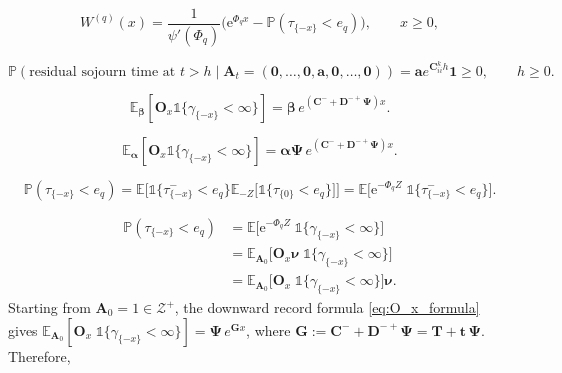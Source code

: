 \documentclass[10pt,a4paper]{amsart}
\newcommand{\PP}{\mathbb{P}}
\newcommand{\e}{\mathrm{e}}
\begin{document}
\begin{equation}\label{eq:Ivanovs_identity}
W^{(q)}(x) = \frac{1}{\psi'(\Phi_q)} \Big( \e^{\Phi_q x} - \PP(\tau_{\{-x\}} < e_q) \Big), \qquad x \ge 0,
\end{equation}

\begin{equation}\label{eq:residual_sojourn_component}
\mathbb{P}(\text{residual sojourn time at } t > h \mid \bm{A}_t = (\bm{0}, \ldots, \bm{0}, \bm{a}, \bm{0}, \ldots, \bm{0})) = \bm{a} e^{\bm{C}_{ii}^k h} \bm{1} \ge 0, \qquad h \ge 0.
\end{equation}

\begin{equation}\label{eq:O_x_formula_minus}
\mathbb{E}_{\bm{\beta}}[\bm{O}_x \mathds{1}\{\gamma_{\{-x\}} < \infty\}] = \bm{\beta} \, e^{(\bm{C}^- + \bm{D}^{-+}\bm{\Psi})x}.
\end{equation}

\begin{equation}\label{eq:O_x_formula}
\mathbb{E}_{\bm{\alpha}}[\bm{O}_x \mathds{1}\{\gamma_{\{-x\}} < \infty\}] = \bm{\alpha} \bm{\Psi} \, e^{(\bm{C}^- + \bm{D}^{-+}\bm{\Psi})x}.
\end{equation}

\begin{equation}\label{eq:hitting_factor}
\PP(\tau_{\{-x\}} < e_q) = \mathbb{E}\Big[\mathds{1}\big\{\tau^-_{\{-x\}} < e_q\big\}\mathbb{E}_{-Z}\big[\mathds{1}\{\tau_{\{0\}} < e_q\}\big]\Big] = \mathbb{E}\Big[\e^{-\Phi_q Z}\;\mathds{1}\big\{\tau^-_{\{-x\}} < e_q\big\}\Big].
\end{equation}

\begin{equation}\label{eqnBoundedVariationTauxProb}
\begin{split}
\PP(\tau_{\{-x\}} < e_q) 
&= \mathbb{E}\Big[\e^{-\Phi_q Z}\;\mathds{1}\{\gamma_{\{-x\}} < \infty\}\Big]\\
&= \mathbb{E}_{\bm A_0}\Big[\bm{O}_x \bm{\nu}\;\mathds{1}\{\gamma_{\{-x\}} < \infty\}\Big]\\
&= \mathbb{E}_{\bm A_0}\Big[\bm{O}_x\;\mathds{1}\{\gamma_{\{-x\}} < \infty\}\Big]\bm{\nu}.
\end{split}
\end{equation}Starting from $\bm{A}_0 = 1 \in \mathcal{Z}^+$, the downward record formula \eqref{eq:O_x_formula} gives $\mathbb{E}_{\bm A_0}[\bm{O}_x\;\mathds{1}\{\gamma_{\{-x\}} < \infty\}] = \bm{\Psi}\, e^{\bm{G}x}$, where $\bm{G} := \bm{C}^- + \bm{D}^{-+}\bm{\Psi}= \bm{T} + \bm{t}\,\bm{\Psi}$. Therefore,
\end{document}
